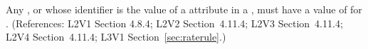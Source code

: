 Any \Compartment, \Species or \Parameter whose identifier is the value of a
 attribute in a \RateRule, must have a value of 
for .  (References: L2V1 Section 4.8.4; L2V2 Section~4.11.4;
L2V3 Section~4.11.4; L2V4 Section~4.11.4; L3V1 Section~\ref{sec:raterule}.)
